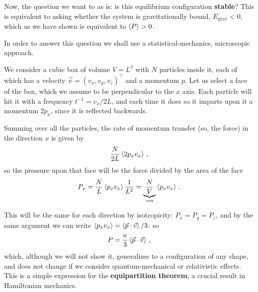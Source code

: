 \documentclass[main.tex]{subfiles}
\begin{document}

Now, the question we want to as is: is this equilibrium configuration \textbf{stable}? This is equivalent to asking whether the system is gravitationally bound, \(E _{\text{grav}} < 0\), which as we have shown is equivalent to \(\expval{P}> 0\).  

In order to answer this question we shall use a statistical-mechanics, microscopic approach. 

We consider a cubic box of volume \(V = L^3\) with \(N\) particles inside it, each of which has a velocity \(\vec{v} = (v_x, v_y, v_z)^{\top}\) and a momentum \(p\). Let us select a face of the box, which we assume to be perpendicular to the \(x\) axis. Each particle will hit it with a frequency \(t^{-1} = v_x / 2L\), and each time it does so it imparts upon it a momentum \(2 p_x\), since it is reflected backwards.

Summing over all the particles, the rate of momentum transfer (so, the force) in the direction \(x\) is given by 
%
\begin{align}
  \frac{N}{2L} \expval{2p_x v_x}
\,,
\end{align}
%
so the pressure upon that face will be the force divided by the area of the face
%
\begin{align}
P_x = \frac{N}{L} \expval{p_x v_x} \frac{1}{L^2} = \underbrace{\frac{N}{V}}_{= n} \expval{p_x v_x}
\,.
\end{align}

This will be the same for each direction by isotropicity: \(P_x = P_y = P_z\), and by the same argument we can write \(\expval{p_x v_x} = \expval{\vec{p} \cdot \vec{v}} / 3\): so 
%
\begin{align}
  P = \frac{n}{3} \expval{\vec{p} \cdot \vec{v}}
\,,
\end{align}
%
which, although we will not show it, generalizes to a configuration of any shape, and does not change if we consider quantum-mechanical or relativistic effects.
This is a simple expression for the \textbf{equipartition theorem}, a crucial result in Hamiltonian mechanics. 
\end{document}
